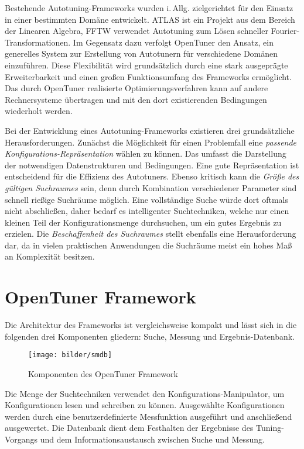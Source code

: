 \documentclass[a4paper,11pt]{scrartcl}
\newcommand{\iAllg}{\mbox{i.\,Allg.}\xspace}
\begin{document}
Bestehende Autotuning-Frameworks wurden \iAllg zielgerichtet für den Einsatz in einer 
bestimmten Domäne entwickelt. \textsc{ATLAS} \cite{atlas} ist ein Projekt aus dem Bereich der Linearen Algebra,
\textsc{FFTW} \cite{fftw} verwendet Autotuning zum Lösen schneller Fourier-Transformationen.
Im Gegensatz dazu verfolgt OpenTuner den Ansatz, ein generelles System zur Erstellung 
von Autotunern für verschiedene Domänen einzuführen. Diese Flexibilität wird grundsätzlich durch eine stark
ausgeprägte Erweiterbarkeit und einen großen Funktionsumfang des Frameworks ermöglicht.
Das durch OpenTuner realisierte Optimierungsverfahren kann auf andere Rechnersysteme übertragen
und mit den dort existierenden Bedingungen wiederholt werden. \newline

Bei der Entwicklung eines Autotuning-Frameworks existieren drei grundsätzliche Herausforderungen.
Zunächst die Möglichkeit für einen Problemfall eine \emph{passende Konfigurations-Repräsentation} wählen
zu können. Das umfasst die Darstellung der notwendigen Datenstrukturen und Bedingungen. Eine gute 
Repräsentation ist entscheidend für die Effizienz des Autotuners. Ebenso kritisch kann die 
\emph{Größe des gültigen Suchraumes} sein, denn durch Kombination verschiedener Parameter sind 
schnell rießige Suchräume möglich. Eine vollständige Suche würde dort oftmals nicht abschließen,
daher bedarf es intelligenter Suchtechniken, welche nur einen kleinen Teil der Konfigurationsmenge
durchsuchen, um ein gutes Ergebnis zu erzielen. Die \emph{Beschaffenheit des Suchraumes} stellt
ebenfalls eine Herausforderung dar, da in vielen praktischen Anwendungen die Suchräume meist ein
hohes Maß an Komplexität besitzen.


\section{OpenTuner Framework}
Die Architektur des Frameworks ist vergleichsweise kompakt und lässt sich in die folgenden drei 
Komponenten gliedern: Suche, Messung und Ergebnis-Datenbank.


\begin{figure}[h]
\begin{center}
\texttt{[image: bilder/smdb]}
\cite{OT-paper} \caption{Komponenten des OpenTuner Framework} 
\end{center}   
\end{figure}

Die Menge der Suchtechniken verwendet den Konfigurations-Manipulator, um Konfigurationen lesen und 
schreiben zu können. Ausgewählte Konfigurationen werden durch eine benutzerdefinierte Messfunktion
ausgeführt und anschließend ausgewertet. Die Datenbank dient dem Festhalten der Ergebnisse des Tuning-Vorgangs
und dem Informationsaustausch zwischen Suche und Messung.
\end{document}
